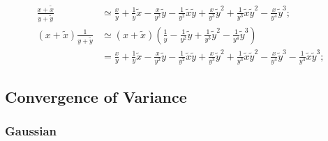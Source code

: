 \documentclass[twoside]{article}
\numberwithin{equation}{section}
\begin{document}
\begin{align*}
\frac{x + \tilde{x}}{y + \tilde{y}} &\simeq \frac{x}{y} + \frac{1}{y} \tilde{x} - \frac{x}{y^2} \tilde{y}
  		 - \frac{1}{y^2} \tilde{x} \tilde{y} + \frac{x}{y^3} \tilde{y}^2
		 + \frac{1}{y^3} \tilde{x} \tilde{y}^2 - \frac{x}{y^4} \tilde{y}^3; \\
(x + \tilde{x}) \frac{1}{y + \tilde{y}} &\simeq (x + \tilde{x}) \left( \frac{1}{y} - \frac{1}{y^2} \tilde{y} + \frac{1}{y^3} \tilde{y}^2 - \frac{1}{y^4} \tilde{y}^3 \right) \\
	&= \frac{x}{y} + \frac{1}{y} \tilde{x} - \frac{x}{y^2} \tilde{y} - \frac{1}{y^2} \tilde{x} \tilde{y} + \frac{x}{y^3} \tilde{y}^2  + \frac{1}{y^3} \tilde{x} \tilde{y}^2
		 -  \frac{x}{y^4} \tilde{y}^3 - \frac{1}{y^4} \tilde{x} \tilde{y}^3;
\end{align*}



\subsection{Convergence of Variance}

\subsubsection{Gaussian}
\end{document}
